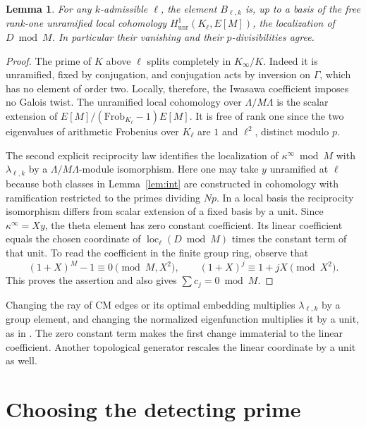 \documentclass[11pt]{article}
\newtheorem{lemma}[theorem]{Lemma}
\newcommand{\loc}{\operatorname{loc}}
\begin{document}
\begin{lemma}\label{lem:local}
For any \(k\)-admissible \(\ell\), the element \(B_{\ell,k}\) is, up to a basis of the free rank-one unramified local cohomology \(H^1_{\mathrm{unr}}(K_\ell,E[M])\), the localization of \(D\bmod M\). In particular their vanishing and their \(p\)-divisibilities agree.
\end{lemma}
\begin{proof}
The prime of \(K\) above \(\ell\) splits completely in \(K_\infty/K\). Indeed it is unramified, fixed by conjugation, and conjugation acts by inversion on \(\Gamma\), which has no element of order two. Locally, therefore, the Iwasawa coefficient imposes no Galois twist. The unramified local cohomology over \(\Lambda/M\Lambda\) is the scalar extension of \(E[M]/(\mathrm{Frob}_{K_\ell}-1)E[M]\). It is free of rank one since the two eigenvalues of arithmetic Frobenius over \(K_\ell\) are \(1\) and \(\ell^2\), distinct modulo \(p\).

The second explicit reciprocity law \cite[Thm.~3.16, indefinite index \(1\)]{FG} identifies the localization of \(\kappa^\infty\bmod M\) with \(\lambda_{\ell,k}\) by a \(\Lambda/M\Lambda\)-module isomorphism. Here one may take \(y\) unramified at \(\ell\) because both classes in Lemma~\ref{lem:int} are constructed in cohomology with ramification restricted to the primes dividing \(Np\). In a local basis the reciprocity isomorphism differs from scalar extension of a fixed basis by a unit. Since \(\kappa^\infty=Xy\), the theta element has zero constant coefficient. Its linear coefficient equals the chosen coordinate of \(\loc_\ell(D\bmod M)\) times the constant term of that unit. To read the coefficient in the finite group ring, observe that
\[
 (1+X)^M-1\equiv 0\pmod{M,X^2},\qquad
 (1+X)^j\equiv1+jX\pmod{X^2}.
\]
This proves the assertion and also gives \(\sum c_j=0\bmod M\).
\end{proof}

Changing the ray of CM edges or its optimal embedding multiplies \(\lambda_{\ell,k}\) by a group element, and changing the normalized eigenfunction multiplies it by a unit, as in \cite[Rem.~3.13 and \S3.4.4]{FG}. The zero constant term makes the first change immaterial to the linear coefficient. Another topological generator rescales the linear coordinate by a unit as well.

\section{Choosing the detecting prime}
\end{document}
